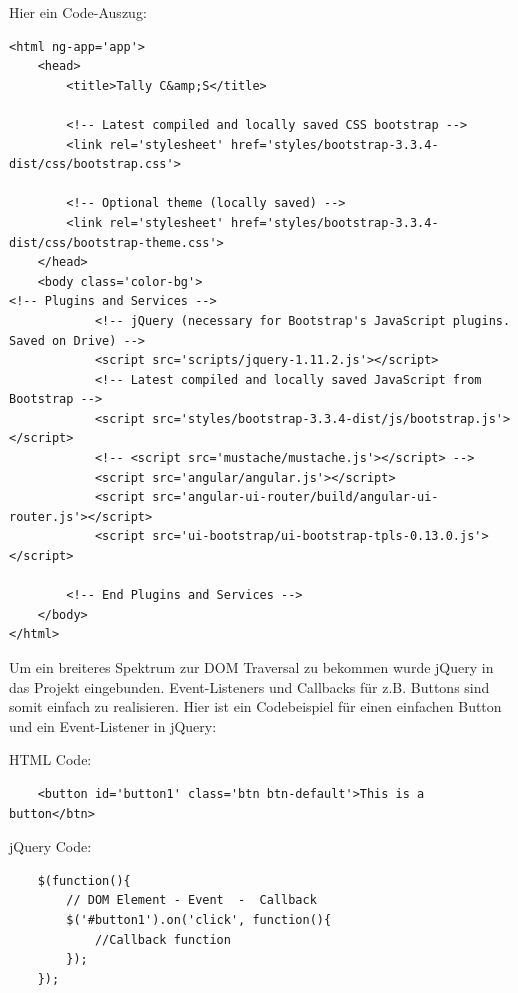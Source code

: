 \documentclass[11pt,a4paper]{article} %
\begin{document}
 Hier ein Code-Auszug:
\begin{frame}

\begin{lstlisting}
<html ng-app='app'>
	<head>
		<title>Tally C&amp;S</title>		
		
		<!-- Latest compiled and locally saved CSS bootstrap -->
		<link rel='stylesheet' href='styles/bootstrap-3.3.4-dist/css/bootstrap.css'>

		<!-- Optional theme (locally saved) -->
		<link rel='stylesheet' href='styles/bootstrap-3.3.4-dist/css/bootstrap-theme.css'>
	</head>
	<body class='color-bg'> 
<!-- Plugins and Services -->
			<!-- jQuery (necessary for Bootstrap's JavaScript plugins. Saved on Drive) -->
			<script src='scripts/jquery-1.11.2.js'></script>
			<!-- Latest compiled and locally saved JavaScript from Bootstrap -->
			<script src='styles/bootstrap-3.3.4-dist/js/bootstrap.js'></script>
			<!-- <script src='mustache/mustache.js'></script> -->
			<script src='angular/angular.js'></script>
			<script src='angular-ui-router/build/angular-ui-router.js'></script>
			<script src='ui-bootstrap/ui-bootstrap-tpls-0.13.0.js'></script>

		<!-- End Plugins and Services -->
	</body>
</html>
\end{lstlisting}
\end{frame}

Um ein breiteres Spektrum zur DOM Traversal zu bekommen wurde jQuery in das Projekt eingebunden. Event-Listeners und Callbacks für z.B. Buttons sind somit einfach zu realisieren. Hier ist ein Codebeispiel für einen einfachen Button und ein Event-Listener in jQuery:

HTML Code:
\begin{frame}

\begin{lstlisting}
	<button id='button1' class='btn btn-default'>This is a button</btn>
\end{lstlisting}
\end{frame}

jQuery Code:
\begin{frame}

\begin{lstlisting}
	$(function(){
		// DOM Element - Event  -  Callback
		$('#button1').on('click', function(){
			//Callback function
		});
	});
\end{lstlisting}
\end{frame}
\end{document}
